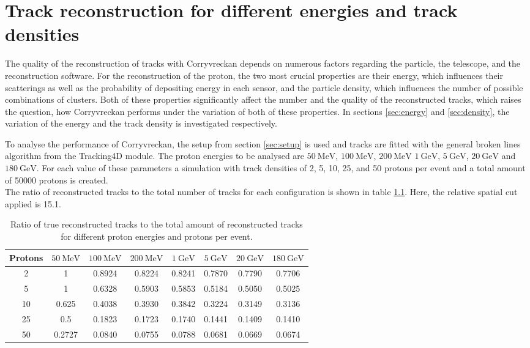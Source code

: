 \chapter{Track reconstruction for different energies and track densities}
The quality of the reconstruction of tracks with Corryvreckan depends on numerous factors regarding the particle, the telescope, and the reconstruction software.
For the reconstruction of the proton, the two most crucial properties are their energy, which influences their scatterings as well as the probability of
depositing energy in each sensor, and the particle density, which influences the number of possible combinations of clusters.
Both of these properties significantly affect the number and the quality of the reconstructed tracks, which raises the question, how Corryvreckan performs
under the variation of both of these properties.
In sections \ref{sec:energy} and \ref{sec:density}, the variation of the energy and the track density is investigated respectively.

To analyse the performance of Corryvreckan, the setup from section \ref{sec:setup} is used and tracks are fitted with the general broken lines algorithm from the Tracking4D module.
The proton energies to be analysed are $\SI{50}{\mega\eV}$, $\SI{100}{\mega\eV}$, $\SI{200}{\mega\eV}$
$\SI{1}{\giga\eV}$, $\SI{5}{\giga\eV}$, $\SI{20}{\giga\eV}$ and $\SI{180}{\giga\eV}$. For each value of these parameters a simulation with track densities
of 2, 5, 10, 25, and 50 protons per event and a total amount of 50000 protons is created. \\
The ratio of reconstructed tracks to the total number of tracks for each configuration is shown in table \ref{tab:study}. Here, the relative spatial cut applied is 15.1.


\begin{table}
  \centering
  \begin{tabular}{c | c c c c c c c}
    \toprule
     Protons &  $\SI{50}{\mega\eV}$ & $\SI{100}{\mega\eV}$ & $\SI{200}{\mega\eV}$ & $\SI{1}{\giga\eV}$ & $\SI{5}{\giga\eV}$ & $\SI{20}{\giga\eV}$ & $\SI{180}{\giga\eV}$ \\
    \midrule
     2   & 1 & 0.8924 & 0.8224 & 0.8241 & 0.7870 & 0.7790 & 0.7706  \\
     5   & 1 & 0.6328 & 0.5903 & 0.5853 & 0.5184 & 0.5050 & 0.5025  \\
     10  & 0.625 & 0.4038 & 0.3930 & 0.3842 & 0.3224 & 0.3149 & 0.3136  \\
     25  & 0.5 & 0.1823 & 0.1723 & 0.1740 & 0.1441 & 0.1409 & 0.1410  \\
     50  & 0.2727 & 0.0840 & 0.0755 & 0.0788 & 0.0681 & 0.0669 & 0.0674  \\
  \end{tabular}
  \caption{Ratio of true reconstructed tracks to the total amount of reconstructed tracks for different proton energies and protons per event.}
  \label{tab:study}
\end{table}

